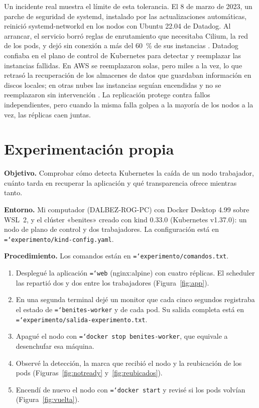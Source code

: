 \documentclass[11pt,a4paper]{article}
\newcommand{\cmd}[1]{\texttt{\hyphenchar\font=`\-\relax #1}}
\begin{document}
Un incidente real muestra el límite de esta tolerancia. El 8 de marzo de 2023, un parche de seguridad de systemd, instalado por las actualizaciones automáticas, reinició systemd-networkd en los nodos con Ubuntu 22.04 de Datadog. Al arrancar, el servicio borró reglas de enrutamiento que necesitaba Cilium, la red de los pods, y dejó sin conexión a más del 60~\% de sus instancias \cite{datadog2023}. Datadog confiaba en el plano de control de Kubernetes para detectar y reemplazar las instancias fallidas. En AWS se reemplazaron solas, pero miles a la vez, lo que retrasó la recuperación de los almacenes de datos que guardaban información en discos locales; en otras nubes las instancias seguían encendidas y no se reemplazaron sin intervención \cite{datadog2023}. La replicación protege contra fallos independientes, pero cuando la misma falla golpea a la mayoría de los nodos a la vez, las réplicas caen juntas.

\section{Experimentación propia}
\label{sec:experimento}

\textbf{Objetivo.} Comprobar cómo detecta Kubernetes la caída de un nodo trabajador, cuánto tarda en recuperar la aplicación y qué transparencia ofrece mientras tanto.

\textbf{Entorno.} Mi computador (DALBEZ-ROG-PC) con Docker Desktop 4.99 sobre WSL~2, y el clúster «benites» creado con kind 0.33.0 (Kubernetes v1.37.0): un nodo de plano de control y dos trabajadores. La configuración está en \cmd{experimento/\allowbreak{}kind-config.yaml}.

\textbf{Procedimiento.} Los comandos están en \cmd{experimento/\allowbreak{}comandos.txt}.
\begin{enumerate}
  \item Desplegué la aplicación \cmd{web} (nginx:alpine) con cuatro réplicas. El scheduler las repartió dos y dos entre los trabajadores (Figura~\ref{fig:app}).
  \item En una segunda terminal dejé un monitor que cada cinco segundos registraba el estado de \cmd{benites-worker} y de cada pod. Su salida completa está en \cmd{experimento/\allowbreak{}salida-experimento.txt}.
  \item Apagué el nodo con \cmd{docker stop benites-worker}, que equivale a desenchufar esa máquina.
  \item Observé la detección, la marca que recibió el nodo y la reubicación de los pods (Figuras~\ref{fig:notready} y~\ref{fig:reubicados}).
  \item Encendí de nuevo el nodo con \cmd{docker start} y revisé si los pods volvían (Figura~\ref{fig:vuelta}).
\end{enumerate}
\end{document}

